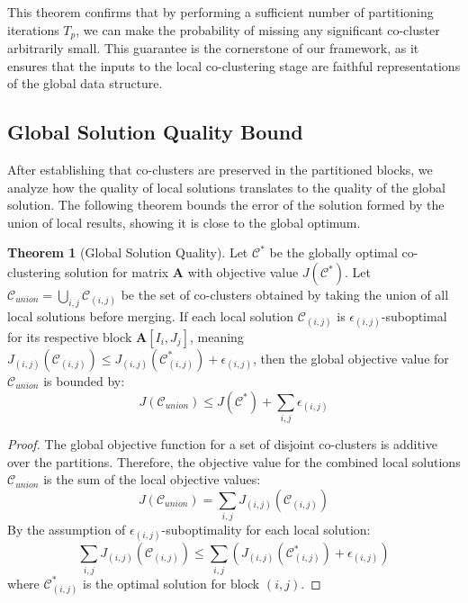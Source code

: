 \documentclass[journal]{IEEEtran}
\theoremstyle{definition}
\newtheorem{theorem}{Theorem}
\theoremstyle{remark} %
\begin{document}
{This theorem confirms that by performing a sufficient number of partitioning iterations $T_p$, we can make the probability of missing any significant co-cluster arbitrarily small. This guarantee is the cornerstone of our framework, as it ensures that the inputs to the local co-clustering stage are faithful representations of the global data structure.

\subsection{Global Solution Quality Bound}
\label{subsec:global-solution-quality-bound}
After establishing that co-clusters are preserved in the partitioned blocks, we analyze how the quality of local solutions translates to the quality of the global solution. The following theorem bounds the error of the solution formed by the union of local results, showing it is close to the global optimum.

\begin{theorem}[Global Solution Quality]
    \label{thm:global-solution-quality}
    Let $\mathcal{C}^*$ be the globally optimal co-clustering solution for matrix $\mathbf{A}$ with objective value $J(\mathcal{C}^*)$. Let $\mathcal{C}_{union} = \bigcup_{i,j} \mathcal{C}_{(i,j)}$ be the set of co-clusters obtained by taking the union of all local solutions before merging. If each local solution $\mathcal{C}_{(i,j)}$ is $\epsilon_{(i,j)}$-suboptimal for its respective block $\mathbf{A}[I_i, J_j]$, meaning $J_{(i,j)}(\mathcal{C}_{(i,j)}) \le J_{(i,j)}(\mathcal{C}_{(i,j)}^*) + \epsilon_{(i,j)}$, then the global objective value for $\mathcal{C}_{union}$ is bounded by:
    \begin{equation}
        J(\mathcal{C}_{union}) \le J(\mathcal{C}^*) + \sum_{i,j} \epsilon_{(i,j)}
    \end{equation}
\end{theorem}
\begin{proof}
    The global objective function for a set of disjoint co-clusters is additive over the partitions. Therefore, the objective value for the combined local solutions $\mathcal{C}_{union}$ is the sum of the local objective values:
    \begin{equation} \label{eq:proof_qual1}
        J(\mathcal{C}_{union}) = \sum_{i,j} J_{(i,j)}(\mathcal{C}_{(i,j)})
    \end{equation}
    By the assumption of $\epsilon_{(i,j)}$-suboptimality for each local solution:
    \begin{equation} \label{eq:proof_qual2}
        \sum_{i,j} J_{(i,j)}(\mathcal{C}_{(i,j)}) \le \sum_{i,j} \left( J_{(i,j)}(\mathcal{C}_{(i,j)}^*) + \epsilon_{(i,j)} \right)
    \end{equation}
    where $\mathcal{C}_{(i,j)}^*$ is the optimal solution for block $(i,j)$.


\end{proof}}
\end{document}
